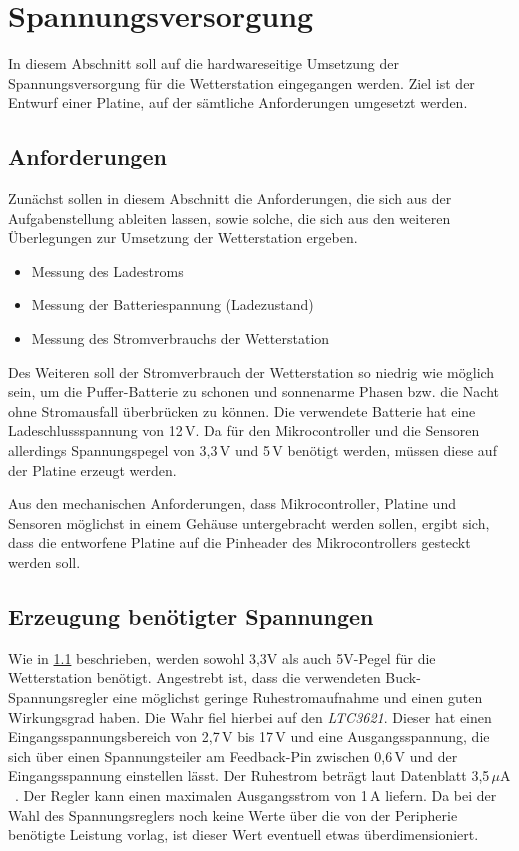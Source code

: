\section{Spannungsversorgung}\label{sec.spannungsversorgung}
In diesem Abschnitt soll auf die hardwareseitige Umsetzung der Spannungsversorgung für die Wetterstation eingegangen werden. Ziel ist der Entwurf einer Platine, auf der sämtliche Anforderungen umgesetzt werden.

\subsection{Anforderungen}\label{subsec.anforderungen}
Zunächst sollen in diesem Abschnitt die Anforderungen, die sich aus der Aufgabenstellung ableiten lassen, sowie solche, die sich aus den weiteren Überlegungen zur Umsetzung der Wetterstation ergeben.

\begin{itemize}

	\item Messung des Ladestroms
	\item Messung der Batteriespannung (Ladezustand)
	\item Messung des Stromverbrauchs der Wetterstation

\end{itemize}

Des Weiteren soll der Stromverbrauch der Wetterstation so niedrig wie möglich sein, um die Puffer-Batterie zu schonen und sonnenarme Phasen bzw. die Nacht ohne Stromausfall überbrücken zu können. Die verwendete Batterie hat eine Ladeschlussspannung von 12\,V. Da für den Mikrocontroller und die Sensoren allerdings Spannungspegel von 3,3\,V und 5\,V benötigt werden, müssen diese auf der Platine erzeugt werden.

Aus den mechanischen Anforderungen, dass Mikrocontroller, Platine und Sensoren möglichst in einem Gehäuse untergebracht werden sollen, ergibt sich, dass die entworfene Platine auf die Pinheader des Mikrocontrollers gesteckt werden soll.

\subsection{Erzeugung benötigter Spannungen}\label{subsec.Spannungserzeugung}
Wie in \ref{subsec.anforderungen} beschrieben, werden sowohl 3,3V als auch 5V-Pegel für die Wetterstation benötigt. Angestrebt ist, dass die verwendeten Buck-Spannungsregler eine möglichst geringe Ruhestromaufnahme und einen guten Wirkungsgrad haben. Die Wahr fiel hierbei auf den \textit{LTC3621}. Dieser hat einen Eingangsspannungsbereich von 2,7\,V bis 17\,V und eine Ausgangsspannung, die sich über einen Spannungsteiler am Feedback-Pin zwischen 0,6\,V und der Eingangsspannung einstellen lässt. Der Ruhestrom beträgt laut Datenblatt 3,5\,$\mu$A ~\cite{ltc3621}. Der Regler kann einen maximalen Ausgangsstrom von 1\,A liefern. Da bei der Wahl des Spannungsreglers noch keine Werte über die von der Peripherie benötigte Leistung vorlag, ist dieser Wert eventuell etwas überdimensioniert.

